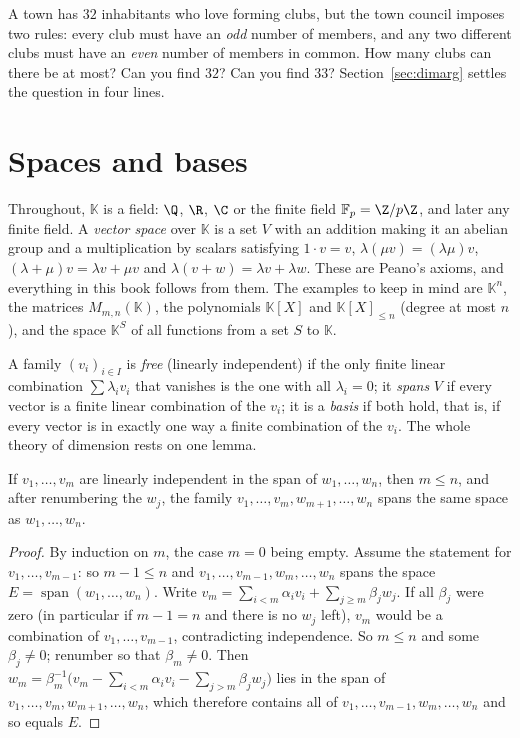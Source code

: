 \begin{think}
A town has $32$ inhabitants who love forming clubs, but the town council imposes two rules: every club must have an
\emph{odd} number of members, and any two different clubs must have an \emph{even} number of members in common. How many
clubs can there be at most? Can you find $32$? Can you find $33$? Section~\ref{sec:dimarg} settles the question in
four lines.
\end{think}

\section{Spaces and bases}

Throughout, $\mathbb K$ is a field: $\Q$, $\R$, $\C$ or the finite field $\mathbb F_p=\Z/p\Z$, and later any finite field.
A \emph{vector space} over $\mathbb K$ is a set $V$ with an addition making it an abelian group and a multiplication by
scalars satisfying $1\cdot v=v$, $\lambda(\mu v)=(\lambda\mu)v$, $(\lambda+\mu)v=\lambda v+\mu v$ and
$\lambda(v+w)=\lambda v+\lambda w$. These are Peano's axioms, and everything in this book follows from them. The
examples to keep in mind are $\mathbb K^n$, the matrices $M_{m,n}(\mathbb K)$, the polynomials $\mathbb K[X]$ and
$\mathbb K[X]_{\le n}$ (degree at most $n$), and the space $\mathbb K^S$ of all functions from a set $S$ to $\mathbb K$.

A family $(v_i)_{i\in I}$ is \emph{free} (linearly independent) if the only finite linear combination
$\sum\lambda_iv_i$ that vanishes is the one with all $\lambda_i=0$; it \emph{spans} $V$ if every vector is a finite
linear combination of the $v_i$; it is a \emph{basis} if both hold, that is, if every vector is in exactly one way a
finite combination of the $v_i$. The whole theory of dimension rests on one lemma.

\begin{lemma}\label{lem:steinitz}
If $v_1,\dots,v_m$ are linearly independent in the span of $w_1,\dots,w_n$, then $m\le n$, and after renumbering the
$w_j$, the family $v_1,\dots,v_m,w_{m+1},\dots,w_n$ spans the same space as $w_1,\dots,w_n$.
\end{lemma}
\begin{proof}
By induction on $m$, the case $m=0$ being empty. Assume the statement for $v_1,\dots,v_{m-1}$: so $m-1\le n$ and
$v_1,\dots,v_{m-1},w_m,\dots,w_n$ spans the space $E=\operatorname{span}(w_1,\dots,w_n)$. Write
$v_m=\sum_{i<m}\alpha_iv_i+\sum_{j\ge m}\beta_jw_j$. If all $\beta_j$ were zero (in particular if $m-1=n$ and there is no
$w_j$ left), $v_m$ would be a combination of $v_1,\dots,v_{m-1}$, contradicting independence. So $m\le n$ and some
$\beta_j\ne0$; renumber so that $\beta_m\ne0$. Then $w_m=\beta_m^{-1}\bigl(v_m-\sum_{i<m}\alpha_iv_i-\sum_{j>m}\beta_jw_j\bigr)$
lies in the span of $v_1,\dots,v_m,w_{m+1},\dots,w_n$, which therefore contains all of $v_1,\dots,v_{m-1},w_m,\dots,w_n$
and so equals $E$.
\end{proof}

